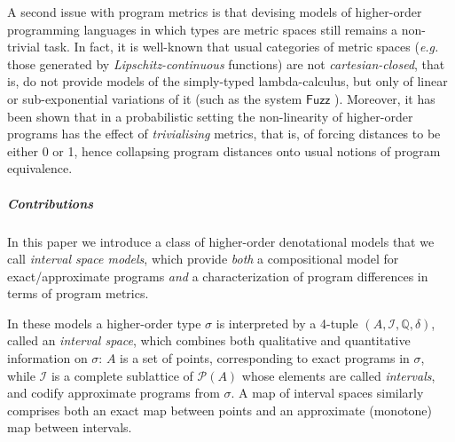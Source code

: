A second issue with program metrics is that devising models of higher-order programming languages in which types are metric spaces still remains a non-trivial task. In fact, it is well-known that usual categories of metric spaces (\textit{e.g.} those generated by \emph{Lipschitz-continuous} functions)
are not \emph{cartesian-closed}, that is, do not provide models of the simply-typed lambda-calculus, but only of linear or sub-exponential variations of it (such as the system $\mathsf{Fuzz}$ \cite{10.1145/1932681.1863568,Gaboardi_2013,Azevedo_de_Amorim_2017}).
Moreover, it has been shown \cite{10.1109/LICS.2015.64} that in a probabilistic setting the non-linearity of higher-order programs has the effect of \emph{trivialising} metrics, that is, of forcing distances to be either 0 or 1, hence collapsing program distances onto usual notions of program equivalence.
%









\subparagraph*{Contributions}



In this paper we introduce a class of higher-order denotational models that we call \emph{interval space models}, which 
provide \emph{both} a compositional model for exact/approximate programs \emph{and} a characterization of program differences in terms of program metrics.
 
In these models a higher-order type $\sigma$ is interpreted by a 4-tuple $(A, \mathcal I, \mathbb Q, \delta)$, called an \emph{interval space}, which combines both qualitative and quantitative information on $\sigma$: $A$ is a set of points, corresponding to exact programs in $\sigma$, while $\mathcal I$ is a complete sublattice of $\mathcal P(A)$ whose elements are called \emph{intervals}, and codify approximate programs from $\sigma$. A map of interval spaces similarly comprises both an exact map between points and an approximate (monotone) map between intervals.

